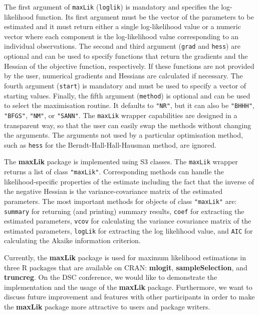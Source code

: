 \documentclass[10pt]{article}
\newcommand{\code}[1]{\texttt{#1}}
\begin{document}
The first argument of \code{maxLik} (\code{loglik})
is mandatory and specifies the log-likelihood function.
Its first argument must be the vector of the parameters to be estimated
and it must return either a single log-likelihood value or
a numeric vector where each component is the log-likelihood value
corresponding to an individual observations.
The second and third argument (\code{grad} and \code{hess})
are optional and can be used to specify functions
that return the gradients and the Hessian of the objective function,
respectively.
If these functions are not provided by the user,
numerical gradients and Hessians are calculated if necessary.
The fourth argument (\code{start}) is mandatory and
must be used to specify a vector of starting values.
Finally, the fifth argument (\code{method}) is optional and
can be used to select the maximisation routine.
It defaults to \code{"NR"}, but it can also be \code{"BHHH"},
\code{"BFGS"}, \code{"NM"}, or \code{"SANN"}.  The \code{maxLik}
wrapper capabilities are designed in a transparent way, so that the
user can easily swap the methods without changing the
arguments.  The arguments not used by a particular optimisation
method, such as \code{hess} for the Berndt-Hall-Hall-Hausman method,
are ignored.

The \textbf{maxLik} package is implemented using S3 classes.
The \code{maxLik} wrapper returns a list of class \code{"maxLik"}.
Corresponding methods can handle the likelihood-specific properties
of the estimate including the fact
that the inverse of the negative Hessian is the variance-covariance matrix
of the estimated parameters.
The most important methods for objects of class \code{"maxLik"} are:
\code{summary} for returning (and printing) summary results,
\code{coef} for extracting the estimated parameters,
\code{vcov} for calculating the variance covariance matrix
of the estimated parameters,
\code{logLik} for extracting the log likelihood value, and
\code{AIC} for calculating the Akaike information criterion.

Currently, the \textbf{maxLik} package is used for maximum likelihood
estimations in three \textsf{R} packages that are available on CRAN:
\textbf{mlogit}, \textbf{sampleSelection},
and \textbf{truncreg}.
On the DSC conference,
we would like to demonstrate the implementation and the usage
of the \textbf{maxLik} package.
Furthermore, we want to discuss future improvement and features
with other participants
in order to make the \textbf{maxLik} package more attractive
to users and package writers.

%
%
\end{document}
